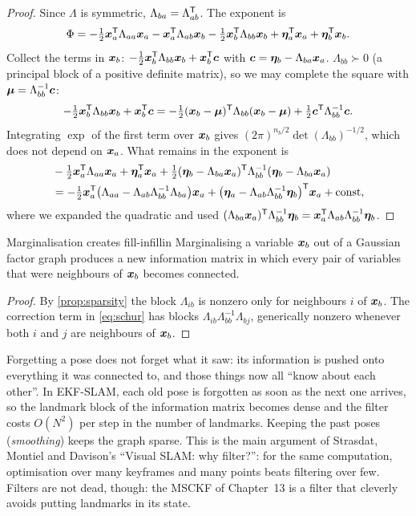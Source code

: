 \begin{proof}
Since $\Lambda$ is symmetric, $\Lambda_{ba}=\Lambda_{ab}^{\mathsf{T}}$. The exponent is
\[
\Phi=-\tfrac12\bm{x}_a^{\mathsf{T}}\Lambda_{aa}\bm{x}_a-\bm{x}_a^{\mathsf{T}}\Lambda_{ab}\bm{x}_b
-\tfrac12\bm{x}_b^{\mathsf{T}}\Lambda_{bb}\bm{x}_b+\bm{\eta}_a^{\mathsf{T}}\bm{x}_a+\bm{\eta}_b^{\mathsf{T}}\bm{x}_b .
\]
Collect the terms in $\bm{x}_b$: $-\tfrac12\bm{x}_b^{\mathsf{T}}\Lambda_{bb}\bm{x}_b
+\bm{x}_b^{\mathsf{T}}\bm{c}$ with $\bm{c}=\bm{\eta}_b-\Lambda_{ba}\bm{x}_a$.
$\Lambda_{bb}\succ0$ (a principal block of a positive definite matrix), so
we may complete the square with $\bm{\mu}=\Lambda_{bb}^{-1}\bm{c}$:
\[
-\tfrac12\bm{x}_b^{\mathsf{T}}\Lambda_{bb}\bm{x}_b+\bm{x}_b^{\mathsf{T}}\bm{c}
=-\tfrac12(\bm{x}_b-\bm{\mu})^{\mathsf{T}}\Lambda_{bb}(\bm{x}_b-\bm{\mu})
+\tfrac12\bm{c}^{\mathsf{T}}\Lambda_{bb}^{-1}\bm{c}.
\]
Integrating $\exp$ of the first term over $\bm{x}_b$ gives
$(2\pi)^{n_b/2}\det(\Lambda_{bb})^{-1/2}$, which does not depend on
$\bm{x}_a$. What remains in the exponent is
\begin{align*}
&-\tfrac12\bm{x}_a^{\mathsf{T}}\Lambda_{aa}\bm{x}_a+\bm{\eta}_a^{\mathsf{T}}\bm{x}_a
+\tfrac12(\bm{\eta}_b-\Lambda_{ba}\bm{x}_a)^{\mathsf{T}}\Lambda_{bb}^{-1}
  (\bm{\eta}_b-\Lambda_{ba}\bm{x}_a)\\
&=-\tfrac12\bm{x}_a^{\mathsf{T}}\bigl(\Lambda_{aa}-\Lambda_{ab}\Lambda_{bb}^{-1}
  \Lambda_{ba}\bigr)\bm{x}_a
 +\bigl(\bm{\eta}_a-\Lambda_{ab}\Lambda_{bb}^{-1}\bm{\eta}_b\bigr)^{\mathsf{T}}
  \bm{x}_a+\text{const},
\end{align*}
where we expanded the quadratic and used
$(\Lambda_{ba}\bm{x}_a)^{\mathsf{T}}\Lambda_{bb}^{-1}\bm{\eta}_b
=\bm{x}_a^{\mathsf{T}}\Lambda_{ab}\Lambda_{bb}^{-1}\bm{\eta}_b$.
\end{proof}

\begin{proposition}{Marginalisation creates fill-in}{fillin}
Marginalising a variable $\bm{x}_b$ out of a Gaussian factor graph produces a
new information matrix in which every pair of variables that were
neighbours of $\bm{x}_b$ becomes connected.
\end{proposition}

\begin{proof}
By \cref{prop:sparsity} the block $\Lambda_{ib}$ is nonzero only for
neighbours $i$ of $\bm{x}_b$. The correction term in \eqref{eq:schur} has
blocks $\Lambda_{ib}\Lambda_{bb}^{-1}\Lambda_{bj}$, generically nonzero
whenever both $i$ and $j$ are neighbours of $\bm{x}_b$.
\end{proof}

\begin{inwords}
Forgetting a pose does not forget what it saw: its information is pushed
onto everything it was connected to, and those things now all ``know about
each other''. In EKF-SLAM, each old pose is forgotten as soon as the next
one arrives, so the landmark block of the information matrix becomes
dense and the filter costs $O(N^2)$ per step in the number of landmarks.
Keeping the past poses (\emph{smoothing}) keeps the graph sparse. This is
the main argument of Strasdat, Montiel and Davison's ``Visual SLAM: why
filter?'': for the same computation, optimisation over many keyframes and
many points beats filtering over few. Filters are not dead, though: the
MSCKF of Chapter~13 is a filter that cleverly avoids putting landmarks in
its state.
\end{inwords}

